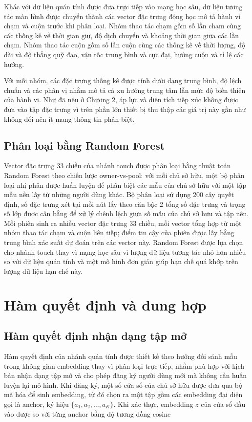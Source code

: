 \documentclass[../DoAn.tex]{subfiles}
\begin{document}
Khác với dữ liệu quán tính được đưa trực tiếp vào mạng học sâu, dữ liệu tương tác màn hình được chuyển thành các vector đặc trưng động học mô tả hành vi chạm và cuộn trước khi phân loại. Nhóm thao tác chạm gồm số lần chạm cùng các thống kê về thời gian giữ, độ dịch chuyển và khoảng thời gian giữa các lần chạm. Nhóm thao tác cuộn gồm số lần cuộn cùng các thống kê về thời lượng, độ dài và độ thẳng quỹ đạo, vận tốc trung bình và cực đại, hướng cuộn và tỉ lệ các hướng.

Với mỗi nhóm, các đặc trưng thống kê được tính dưới dạng trung bình, độ lệch chuẩn và các phân vị nhằm mô tả cả xu hướng trung tâm lẫn mức độ biến thiên của hành vi. Như đã nêu ở Chương 2, áp lực và diện tích tiếp xúc không được đưa vào tập đặc trưng vì trên phần lớn thiết bị thu thập các giá trị này gần như không đổi nên ít mang thông tin phân biệt.

\subsection{Phân loại bằng Random Forest}

Vector đặc trưng 33 chiều của nhánh touch được phân loại bằng thuật toán Random Forest theo chiến lược owner-vs-pool: với mỗi chủ sở hữu, một bộ phân loại nhị phân được huấn luyện để phân biệt các mẫu của chủ sở hữu với một tập mẫu nền lấy từ những người dùng khác. Bộ phân loại sử dụng 200 cây quyết định, số đặc trưng xét tại mỗi nút lấy theo căn bậc 2 tổng số đặc trưng và trọng số lớp được cân bằng để xử lý chênh lệch giữa số mẫu của chủ sở hữu và tập nền. Mỗi phiên sinh ra nhiều vector đặc trưng 33 chiều, mỗi vector tổng hợp từ một nhóm thao tác chạm và cuộn liên tiếp; điểm tin cậy của phiên được lấy bằng trung bình xác suất dự đoán trên các vector này. Random Forest được lựa chọn cho nhánh touch thay vì mạng học sâu vì lượng dữ liệu tương tác nhỏ hơn nhiều so với dữ liệu quán tính và một mô hình đơn giản giúp hạn chế quá khớp trên lượng dữ liệu hạn chế này.

\section{Hàm quyết định và dung hợp}
\label{sec:decision}

\subsection{Hàm quyết định nhận dạng tập mở}

Hàm quyết định của nhánh quán tính được thiết kế theo hướng đối sánh mẫu trong không gian embedding thay vì phân loại trực tiếp, nhằm phù hợp với kịch bản nhận dạng tập mở và cho phép đăng ký người dùng mới mà không cần huấn luyện lại mô hình. Khi đăng ký, một số cửa sổ của chủ sở hữu được đưa qua bộ mã hóa để sinh embedding, từ đó chọn ra một tập gồm các embedding đại diện gọi là anchor, ký hiệu $\{a_1, a_2, \dots, a_K\}$. Khi xác thực, embedding $z$ của cửa sổ đầu vào được so với từng anchor bằng độ tương đồng cosine
\end{document}
